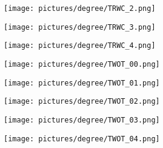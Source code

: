 \begin{figure} \ContinuedFloat
        \centering
        \begin{subfigure}{.49\textwidth}
                \centering
                \texttt{[image: pictures/degree/TRWC\_2.png]}
        \end{subfigure}
        \begin{subfigure}{.49\textwidth}
                \centering
                \texttt{[image: pictures/degree/TRWC\_3.png]}
        \end{subfigure}
\end{figure}
\begin{figure} \ContinuedFloat
        \centering
        \begin{subfigure}{.49\textwidth}
                \centering
                \texttt{[image: pictures/degree/TRWC\_4.png]}
        \end{subfigure}
        \begin{subfigure}{.49\textwidth}
                \centering
                \texttt{[image: pictures/degree/TWOT\_00.png]}
        \end{subfigure}
\end{figure}
\begin{figure} \ContinuedFloat
        \centering
        \begin{subfigure}{.49\textwidth}
                \centering
                \texttt{[image: pictures/degree/TWOT\_01.png]}
        \end{subfigure}
        \begin{subfigure}{.49\textwidth}
                \centering
                \texttt{[image: pictures/degree/TWOT\_02.png]}
        \end{subfigure}
\end{figure}
\begin{figure} \ContinuedFloat
        \centering
        \begin{subfigure}{.49\textwidth}
                \centering
                \texttt{[image: pictures/degree/TWOT\_03.png]}
        \end{subfigure}
        \begin{subfigure}{.49\textwidth}
                \centering
                \texttt{[image: pictures/degree/TWOT\_04.png]}
        \end{subfigure}
\end{figure}
